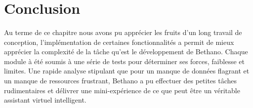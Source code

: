 \section{Conclusion}
\paragraph{}
Au terme de ce chapitre nous avons pu apprécier les fruits d'un long travail de conception, l'implémentation de certaines fonctionnalités a permit de mieux apprécier la complexité de la tâche qu'est le développement de Bethano. Chaque module à été soumis à une série de tests pour déterminer ses forces, faiblesse et limites. Une rapide analyse stipulant que pour un manque de données flagrant et un manque de ressources frustrant, Bethano a pu effectuer des petites tâches rudimentaires et délivrer une mini-expérience de ce que peut être un véritable assistant virtuel intelligent.
